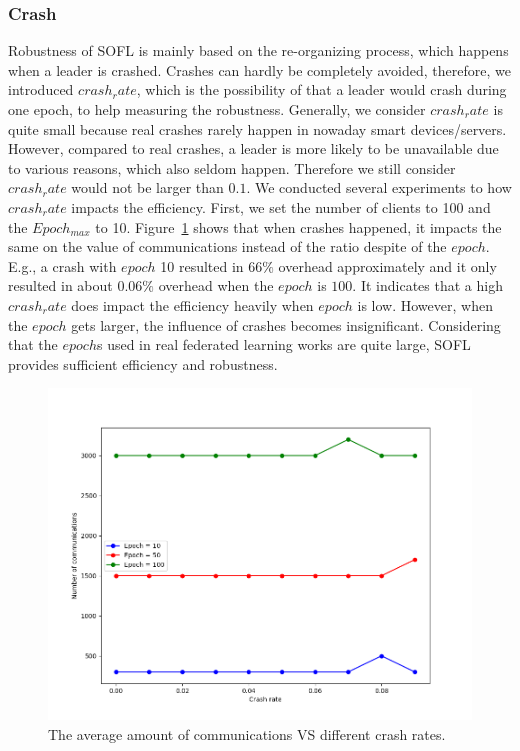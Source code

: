 \subsubsection{Crash}
Robustness of SOFL is mainly based on the re-organizing process, which happens when a leader is crashed. Crashes can hardly be completely avoided, therefore, we introduced $crash_rate$, which is the possibility of that a leader would crash during one epoch, to help measuring the robustness. Generally, we consider $crash_rate$ is quite small because real crashes rarely happen in nowaday smart devices/servers. However, compared to real crashes, a leader is more likely to be unavailable due to various reasons, which also seldom happen. Therefore we still consider $crash_rate$ would not be larger than $0.1$. We conducted several experiments to how $crash_rate$ impacts the efficiency. First, we set the number of clients to 100 and the $Epoch_{max}$ to 10. Figure~\ref{comm-crash} shows that when crashes happened, it impacts the same on the value of communications instead of the ratio despite of the $epoch$. E.g., a crash with $epoch$ 10 resulted in $66\%$ overhead approximately and it only resulted in about $0.06\%$ overhead when the $epoch$ is $100$. It indicates that a high $crash_rate$ does impact the efficiency heavily when $epoch$ is low. However, when the $epoch$ gets larger, the influence of crashes becomes insignificant. Considering that the $epoch$s used in real federated learning works are quite large, SOFL provides sufficient efficiency and robustness.

\begin{figure}[!ht]
    \centering
    \includegraphics[width=\columnwidth]{img/comm-crash.png}
    \caption{The average amount of communications VS different crash rates.}
    \label{comm-crash}
\end{figure}

